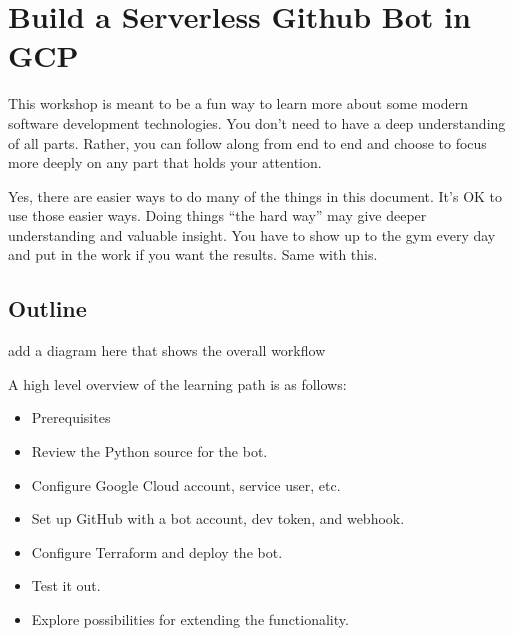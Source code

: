







\section{\label{sec:Start}Build a Serverless Github Bot in GCP}
\vspace{2mm}

\justifying
This workshop is meant to be a fun way to learn more about some modern software development technologies.
You don't need to have a deep understanding of all parts. Rather, you can follow along from end to end
and choose to focus more deeply on any part that holds your attention.

\justifying
Yes, there are easier ways to do many of the things in this document. It's OK to use those easier ways.
Doing things ``the hard way'' may give deeper understanding and valuable insight. You have to show
up to the gym every day and put in the work if you want the results. Same with this.

\subsection{\label{sec:outline}Outline}

add a diagram here that shows the overall workflow

\justifying
A high level overview of the learning path is as follows:

\begin{raggedright}
	\begin{itemize}
		\item Prerequisites
		\item Review the Python source for the bot.
		\item Configure Google Cloud account, service user, etc.
		\item Set up GitHub with a bot account, dev token, and webhook.
		\item Configure Terraform and deploy the bot.
		\item Test it out.
		\item Explore possibilities for extending the functionality.
	\end{itemize}
\end{raggedright}
\vspace{2mm}

